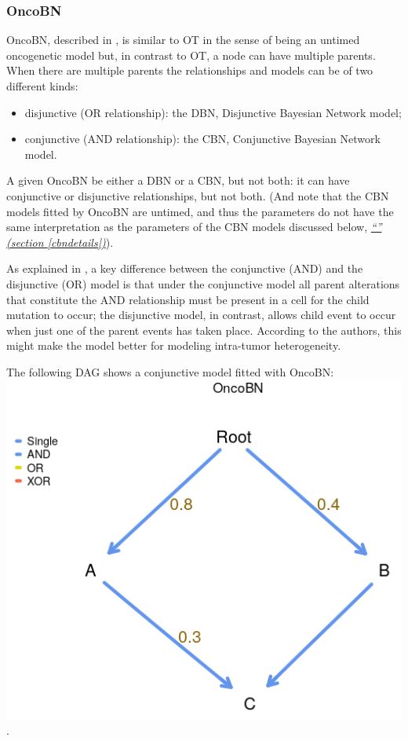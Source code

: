 \documentclass[a4paper,11pt]{article}
\newcommand*{\qref}[1]{\hyperref[{#1}]{\textit{``\nameref*{#1}'' (section \ref*{#1})}}}
\begin{document}




\subsubsection{OncoBN}\label{oncobndetails}

OncoBN, described in \cite{nicol2021oncogenetic}, is similar to OT in the sense of being an untimed oncogenetic model but, in contrast to OT, a node can have multiple parents. When there are multiple parents the relationships and models can be of two different kinds:
\begin{itemize}
\item disjunctive (OR relationship): the DBN, Disjunctive Bayesian Network model;
\item conjunctive (AND relationship): the CBN, Conjunctive Bayesian Network model.
\end{itemize}

A given OncoBN be either a DBN or a CBN, but not both: it can have conjunctive or disjunctive relationships, but not both. (And note that the CBN models fitted by OncoBN are untimed, and thus the parameters do not have the same interpretation as the parameters of the CBN models discussed below, \qref{cbndetails}).

As explained in \citet[p.~2]{nicol2021oncogenetic}, a key difference between the conjunctive (AND) and the disjunctive (OR) model is that under the conjunctive model all parent alterations that constitute the AND relationship must be present in a cell for the child mutation to occur; the disjunctive model, in contrast, allows child event to occur when just one of the parent events has taken place. According to the authors, this might make the model better for modeling intra-tumor heterogeneity.


The following DAG shows a conjunctive model fitted with OncoBN: \\

\includegraphics[width=.45\linewidth]{./oncobn_c1.png}.\\
\end{document}
